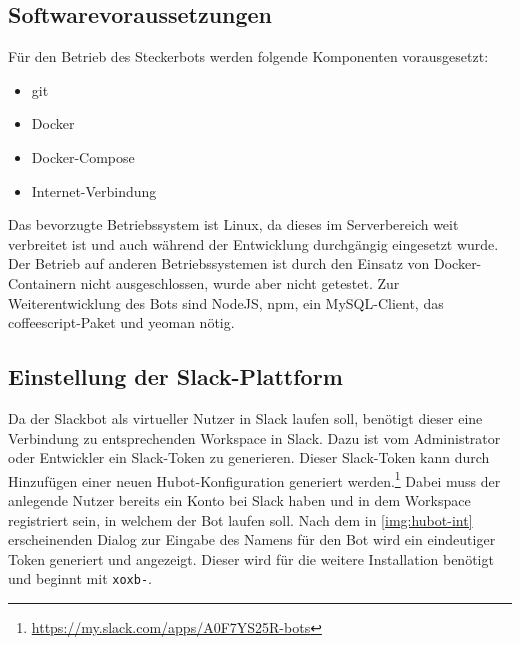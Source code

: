 
\subsection{Softwarevoraussetzungen}
Für den Betrieb des Steckerbots werden folgende Komponenten vorausgesetzt:

\begin{itemize}
\item git
\item Docker
\item Docker-Compose
\item Internet-Verbindung
\end{itemize}

Das bevorzugte Betriebssystem ist Linux, da dieses im Serverbereich weit verbreitet ist und auch während der Entwicklung durchgängig eingesetzt wurde. Der Betrieb auf anderen Betriebssystemen ist durch den Einsatz von Docker-Containern nicht ausgeschlossen, wurde aber nicht getestet.
Zur Weiterentwicklung des Bots sind NodeJS, npm, ein MySQL-Client, das coffeescript-Paket und yeoman nötig.

\subsection{Einstellung der Slack-Plattform}
Da der Slackbot als virtueller Nutzer in Slack laufen soll, benötigt dieser eine Verbindung zu entsprechenden Workspace in Slack. Dazu ist vom Administrator oder Entwickler ein Slack-Token zu generieren.
Dieser Slack-Token kann durch Hinzufügen einer neuen Hubot-Konfiguration generiert werden.\footnote{\url{https://my.slack.com/apps/A0F7YS25R-bots}} Dabei muss der anlegende Nutzer bereits ein Konto bei Slack haben und in dem Workspace registriert sein, in welchem der Bot laufen soll.
Nach dem in \autoref{img:hubot-int} erscheinenden Dialog zur Eingabe des Namens für den Bot wird ein eindeutiger Token generiert und angezeigt. Dieser wird für die weitere Installation benötigt und beginnt mit \texttt{xoxb-}.

